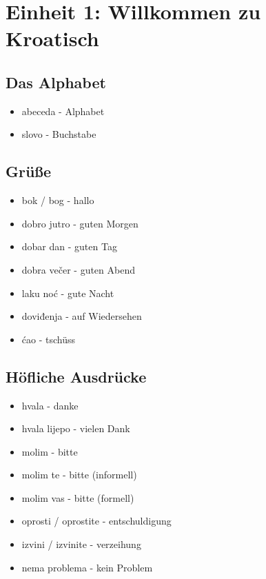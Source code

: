 
\section{Einheit 1: Willkommen zu Kroatisch}

\subsection*{Das Alphabet}
\begin{itemize}
    \item abeceda - Alphabet
    \item slovo - Buchstabe
\end{itemize}

\subsection*{Grüße}
\begin{itemize}
    \item bok / bog - hallo
    \item dobro jutro - guten Morgen
    \item dobar dan - guten Tag
    \item dobra večer - guten Abend
    \item laku noć - gute Nacht
    \item doviđenja - auf Wiedersehen
    \item ćao - tschüss
\end{itemize}

\subsection*{Höfliche Ausdrücke}
\begin{itemize}
    \item hvala - danke
    \item hvala lijepo - vielen Dank
    \item molim - bitte
    \item molim te - bitte (informell)
    \item molim vas - bitte (formell)
    \item oprosti / oprostite - entschuldigung
    \item izvini / izvinite - verzeihung
    \item nema problema - kein Problem
\end{itemize}

